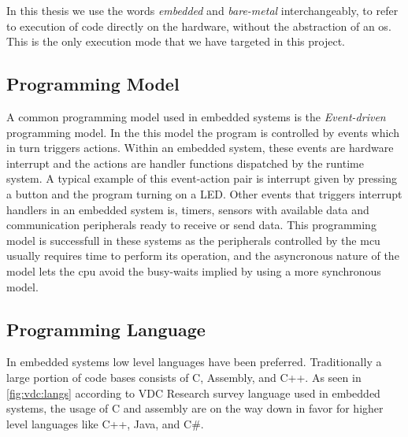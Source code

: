 In this thesis we use the words \emph{embedded} and \emph{bare-metal} interchangeably, to refer to execution of code directly on the hardware, without the abstraction of an \gls{os}.
This is the only execution mode that we have targeted in this project.

\subsection{Programming Model}
A common programming model used in embedded systems is the \emph{Event-driven} programming model.
In the this model the program is controlled by events which in turn triggers actions.
Within an embedded system, these events are hardware interrupt and the actions are handler functions dispatched by the runtime system.
A typical example of this event-action pair is interrupt given by pressing a button and the program turning on a \gls{LED}.
Other events that triggers interrupt handlers in an embedded system is, timers, sensors with available data and communication peripherals ready to receive or send data.
This programming model is successfull in these systems as the peripherals controlled by the \gls{mcu} usually requires time to perform its operation, and the asyncronous nature of the model lets the \gls{cpu} avoid the busy-waits implied by using a more synchronous model.

\subsection{Programming Language}

In embedded systems low level languages have been preferred.
Traditionally a large portion of code bases consists of C, Assembly, and C++.
As seen in \autoref{fig:vdc:langs} according to VDC Research \cite{web:vdc} survey language used in embedded systems, the usage of C and assembly are on the way down in favor for higher level languages like C++, Java, and C\#.

